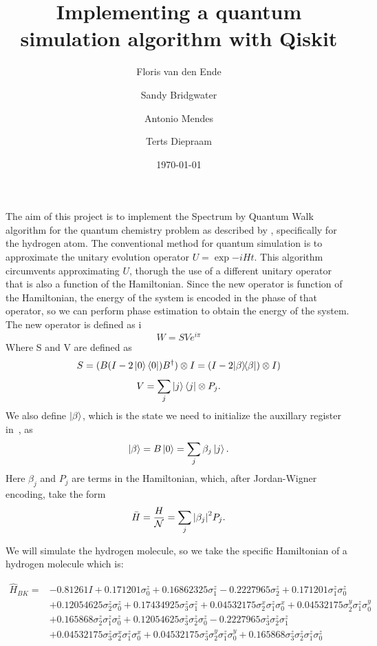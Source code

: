 \documentclass{article}
\title{Implementing a quantum simulation algorithm with Qiskit}
\author{Floris van den Ende\and Sandy Bridgwater\and Antonio Mendes\and Terts Diepraam}
\date{\today}
\def\kb#1#2{| #1 \rangle\!\langle #2 |}
\begin{document}
\maketitle

The aim of this project is to implement the Spectrum by Quantum Walk algorithm for the quantum chemistry problem as described by \textcite{poulin}, specifically for the hydrogen atom. The conventional method for quantum simulation is to approximate the unitary evolution operator $U = \exp{-iHt}$. This algorithm circumvents approximating $U$, thorugh the use of a different unitary operator that is also a function of the Hamiltonian. Since the new operator is function of the Hamiltonian, the energy of the system is encoded in the phase of that operator, so we can perform phase estimation to obtain the energy of the system. The new operator is defined as
i
\begin{equation} \label{W}
W = SV e^{i\pi}
\end{equation}
Where S and V are defined as
\[ S = (B (I - 2 \ket{0}\bra{0}) B^{\dagger}) \otimes I= (I-2\kb \beta \beta) \otimes I) \]
\[ V=\sum_{j}\ket{j}\bra{j} \otimes P_{j}. \]
We also define $\ket{\beta}$, which is the state we need to initialize the auxillary register in~\cite{poulin}, as
\[ \ket{\beta} = B \ket{0} = \sum_j \beta_j \ket{j}. \]
Here $\beta_j$ and $P_j$ are terms in the Hamiltonian, which, after Jordan-Wigner encoding, take the form
\begin{equation}
	\bar H = \frac H{\mathcal{N}} = \sum_j\abs{\beta_j}^2 P_j.
\end{equation}

We will simulate the hydrogen molecule, so we take the specific Hamiltonian of a hydrogen molecule which is:

\begin{align*}
\hat{H}_{B K}=&-0.81261 I+0.171201 \sigma_{0}^{z}+0.16862325 \sigma_{1}^{z}-0.2227965 \sigma_{2}^{z}+0.171201 \sigma_{1}^{z} \sigma_{0}^{z} \\
&+0.12054625 \sigma_{2}^{z} \sigma_{0}^{z}+0.17434925 \sigma_{3}^{z} \sigma_{1}^{z}+0.04532175 \sigma_{2}^{x} \sigma_{1}^{z} \sigma_{0}^{x}+0.04532175 \sigma_{2}^{y} \sigma_{1}^{z} \sigma_{0}^{y} \\
&+0.165868 \sigma_{2}^{z} \sigma_{1}^{z} \sigma_{0}^{z}+0.12054625 \sigma_{3}^{z} \sigma_{2}^{z} \sigma_{0}^{z}-0.2227965 \sigma_{3}^{z} \sigma_{2}^{z} \sigma_{1}^{z} \\
&+0.04532175 \sigma_{3}^{z} \sigma_{2}^{x} \sigma_{1}^{z}
                                                                                                                                                                            \sigma_{0}^{x}+0.04532175 \sigma_{3}^{z} \sigma_{2}^{y} \sigma_{1}^{z} \sigma_{0}^{y}+0.165868 \sigma_{3}^{z} \sigma_{2}^{z} \sigma_{1}^{z} \sigma_{0}^{z} 
\end{align*}
\end{document}
